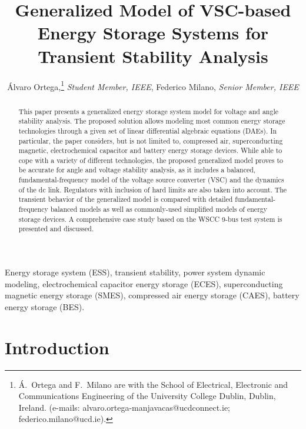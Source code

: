 \documentclass[journal, a4paper]{IEEEtran}
\begin{document}
\title{Generalized Model of VSC-based Energy Storage Systems for
  Transient Stability Analysis}
\author{{\'A}lvaro Ortega,\thanks{{\'A}.~Ortega and F.~Milano are with
    the School of Electrical, Electronic and Communications
    Engineering of the University College Dublin, Dublin, Ireland. \newline
    (e-mails: alvaro.ortega-manjavacas@ucdconnect.ie;
    federico.milano@ucd.ie).} {\em Student Member,
    IEEE}, Federico Milano, {\em Senior Member, IEEE} 
\vspace{-5mm} }

\maketitle


\begin{abstract}
  This paper presents a generalized energy storage system model for
  voltage and angle stability analysis. The proposed solution
    allows modeling most common energy storage technologies through a
    given set of linear differential algebraic equations (DAEs). 
    In particular, the paper considers, but
  is not limited to, compressed air, superconducting magnetic,
  electrochemical capacitor and battery energy storage devices.  While able
  to cope with a variety of different technologies, the proposed
  generalized model proves to be accurate for angle and voltage
    stability analysis, as it includes a balanced,
  fundamental-frequency model of the voltage source converter (VSC)
  and the dynamics of the dc
  link.  Regulators with inclusion of hard limits are also taken into
  account.  The transient behavior of the generalized model is
  compared with detailed fundamental-frequency balanced
  models as well as commonly-used simplified models of
  energy storage devices.  A comprehensive case study based on the
  WSCC 9-bus test system is presented and discussed.
\end{abstract}

\begin{keywords}
  Energy storage system (ESS), transient stability, power system
  dynamic modeling, electrochemical capacitor energy storage (ECES),
  superconducting magnetic energy storage (SMES), compressed air
  energy storage (CAES), battery energy storage (BES).
\end{keywords}

\vspace{-2.5mm}

\section{Introduction}
\label{sec:intro}
\end{document}
